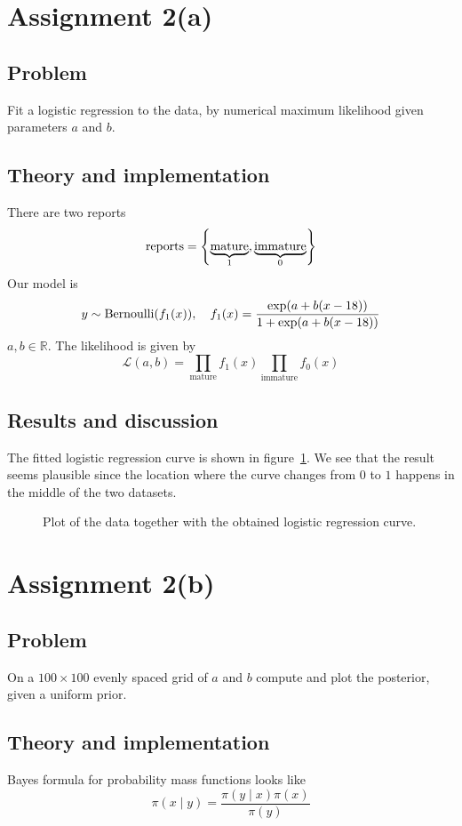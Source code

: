 \documentclass[11pt, a4paper]{article}
\let\originalleft\left
\let\originalright\right
\renewcommand{\left}{\mathopen{}\mathclose\bgroup\originalleft}
\renewcommand{\right}{\aftergroup\egroup\originalright}
\DeclareMathOperator{\Bernoulli}{Bernoulli}
\begin{document}
\section{Assignment 2(a)}
\subsection{Problem}
Fit a logistic regression to the data, by numerical maximum likelihood
given parameters $a$ and $b$.
\subsection{Theory and implementation}
There are two reports
$$ \text{reports} = \left\{\underbrace{\text{mature}}_1, \underbrace{\text{immature}}_0\right\} $$
Our model is
$$ y \sim \Bernoulli(f_1(x)), \quad f_1(x) = \frac{\exp\left(a + b (x - 18)\right)}{1 + \exp\left(a + b (x - 18)\right)} $$
$a, b \in \mathbb R$.
The likelihood is given by
$$ \mathcal L(a, b) = \prod_{\text{mature}} f_1(x) \prod_{\text{immature}} f_0(x) $$
\subsection{Results and discussion}
The fitted logistic regression curve is shown in figure~\ref{fig:logistic_regression}.
We see that the result seems plausible since the location where the curve
changes from $0$ to $1$ happens in the middle of the two datasets.

\begin{figure}
	\centering
	
	\caption{Plot of the data together with the obtained logistic regression curve. \label{fig:logistic_regression}}
\end{figure}

\section{Assignment 2(b)}
\subsection{Problem}
On a $100 \times 100$ evenly spaced grid of $a$ and $b$ compute and plot
the posterior,
given a uniform prior.
\subsection{Theory and implementation}
Bayes formula for probability mass functions looks like
$$ \pi(x \mid y) = \frac{\pi(y \mid x) \pi(x)}{\pi(y)} $$
\end{document}
